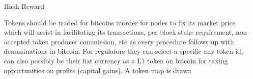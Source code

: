 \documentclass[a4paper,10pt,twocolumn]{article}
\begin{document}
\begin{algorithm}[H]
\SetAlgoLined
\scriptsize
\DontPrintSemicolon
\caption{Hash Reward}

\end{algorithm}

Tokens should be traded for bitcoins inorder for nodes to fix its market price which will assist in facilitating its transactions, per block stake requirement, non-accepted token producer commission, etc as every procedure follows up with denominations in bitcoin. For regulators they can select a specific any token id, can also possibly be their fiat currency as a L1 token on bitcoin for taxing oppurtunities on profits (capital gains). A token map is drawn 


\begin{comment}

\begin{algorithm}[H]
\SetAlgoLined
\scriptsize
\DontPrintSemicolon
\caption{Transfer and renting fees}
\end{algorithm}


\begin{algorithm}[H]
\SetAlgoLined
\scriptsize
\DontPrintSemicolon
\caption{Staking}
\end{algorithm}


\begin{algorithm}[H]
\SetAlgoLined
\scriptsize
\DontPrintSemicolon
\caption{Taxes}
\end{algorithm}


\begin{algorithm}[H]
\SetAlgoLined
\scriptsize
\DontPrintSemicolon
\caption{Swap Script}
\end{algorithm}

\begin{algorithm}[H]
\SetAlgoLined
\scriptsize
\DontPrintSemicolon
\caption{Exchange Rate}
\end{algorithm}

\begin{algorithm}[H]
\SetAlgoLined
\scriptsize
\DontPrintSemicolon
\caption{DAO Contracts}
\end{algorithm}

\end{comment}
\end{document}
